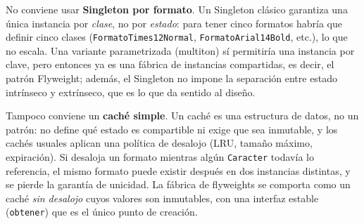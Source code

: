 No conviene usar \textbf{Singleton por formato}. Un Singleton clásico garantiza una única instancia por \emph{clase}, no por \emph{estado}: para tener cinco formatos habría que definir cinco clases (\texttt{FormatoTimes12Normal}, \texttt{FormatoArial14Bold}, etc.), lo que no escala. Una variante parametrizada (multiton) sí permitiría una instancia por clave, pero entonces ya es una fábrica de instancias compartidas, es decir, el patrón Flyweight; además, el Singleton no impone la separación entre estado intrínseco y extrínseco, que es lo que da sentido al diseño.

Tampoco conviene un \textbf{caché simple}. Un caché es una estructura de datos, no un patrón: no define qué estado es compartible ni exige que sea inmutable, y los cachés usuales aplican una política de desalojo (LRU, tamaño máximo, expiración). Si desaloja un formato mientras algún \texttt{Caracter} todavía lo referencia, el mismo formato puede existir después en dos instancias distintas, y se pierde la garantía de unicidad. La fábrica de flyweights se comporta como un caché \emph{sin desalojo} cuyos valores son inmutables, con una interfaz estable (\texttt{obtener}) que es el único punto de creación.

\begin{center}
\begin{minipage}{\linewidth}
\centering
{}
\end{minipage}
\end{center}

